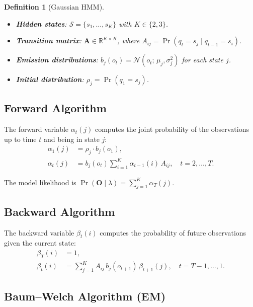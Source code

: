 \documentclass[12pt,a4paper]{article}
\newtheorem{definition}{Definition}[section]
\newcommand{\R}{\mathbb{R}}
\begin{document}
\begin{definition}[Gaussian HMM]
\begin{itemize}[nosep]
    \item \textbf{Hidden states}: $\mathcal{S} = \{s_1, \ldots, s_K\}$ with $K \in \{2, 3\}$.
    \item \textbf{Transition matrix}: $\bm{A} \in \R^{K \times K}$, where $A_{ij} = \Pr(q_t = s_j \mid q_{t-1} = s_i)$.
    \item \textbf{Emission distributions}: $b_j(o_t) = \mathcal{N}(o_t;\, \mu_j, \sigma_j^2)$ for each state $j$.
    \item \textbf{Initial distribution}: $\rho_j = \Pr(q_1 = s_j)$.
\end{itemize}
\end{definition}

\subsection{Forward Algorithm}

The forward variable $\alpha_t(j)$ computes the joint probability of the observations up to time $t$ and being in state $j$:
\begin{align}
    \alpha_1(j) &= \rho_j \cdot b_j(o_1), \label{eq:forward-init} \\
    \alpha_t(j) &= b_j(o_t) \sum_{i=1}^{K} \alpha_{t-1}(i)\, A_{ij}, \quad t = 2, \ldots, T.
    \label{eq:forward-recur}
\end{align}

The model likelihood is $\Pr(\bm{O} \mid \lambda) = \sum_{j=1}^K \alpha_T(j)$.

\subsection{Backward Algorithm}

The backward variable $\beta_t(i)$ computes the probability of future observations given the current state:
\begin{align}
    \beta_T(i) &= 1, \label{eq:backward-init} \\
    \beta_t(i) &= \sum_{j=1}^{K} A_{ij}\, b_j(o_{t+1})\, \beta_{t+1}(j), \quad t = T{-}1, \ldots, 1.
    \label{eq:backward-recur}
\end{align}

\subsection{Baum--Welch Algorithm (EM)}
\label{sec:baum-welch}
\end{document}
